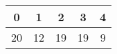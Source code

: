 \begin{tabular}{|c|c|c|c|c|}
    \hline
    0 & 1 & 2 & 3 & 4\\
    \hline
    20 & 12 & 19 & 19 & 9\\
    \hline
    [1ex]
\end{tabular}